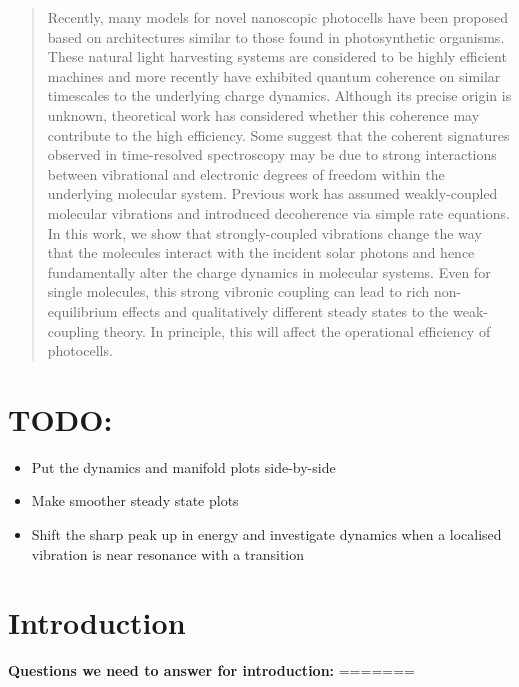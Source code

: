 \documentclass[]{article}
\begin{document}
\begin{abstract}
Recently, many models for novel nanoscopic photocells have been proposed based on architectures similar to those found in photosynthetic organisms. These natural light harvesting systems are considered to be highly efficient machines and more recently have exhibited quantum coherence on similar timescales to the underlying charge dynamics. Although its precise origin is unknown, theoretical work has considered whether this coherence may contribute to the high efficiency. Some suggest that the coherent signatures observed in time-resolved spectroscopy may be due to strong interactions between vibrational and electronic degrees of freedom within the underlying molecular system. 
Previous work has assumed weakly-coupled molecular vibrations and introduced decoherence via simple rate equations. In this work, we show that strongly-coupled vibrations change the way that the molecules interact with the incident solar photons and hence fundamentally alter the charge dynamics in molecular systems. Even for single molecules, this strong vibronic coupling can lead to rich non-equilibrium effects and qualitatively different steady states to the weak-coupling theory. In principle, this will affect the operational efficiency of photocells. \\

\end{abstract}
 
\section{TODO:}
\begin{itemize}
	\item Put the dynamics and manifold plots side-by-side
	\item Make smoother steady state plots
	\item Shift the sharp peak up in energy and investigate dynamics when a localised vibration is near resonance with a transition
\end{itemize}
\section{Introduction}
\textbf{Questions we need to answer for introduction:}
=======
\end{document}
